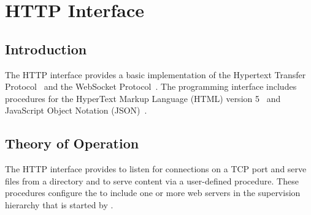 %
%
%


\chapter {HTTP Interface}\label{chap:http}

\section {Introduction}

The HTTP interface provides a basic implementation of the Hypertext
Transfer Protocol~\cite{RFC7230} and the WebSocket
Protocol~\cite{RFC6455}. The programming interface includes procedures
for the HyperText Markup Language (HTML) version 5~\cite{html5} and
JavaScript Object Notation (JSON)~\cite{RFC7159}.

\section {Theory of Operation}

The HTTP interface provides  to listen for
connections on a TCP port and serve files from a directory and
 to serve content via a user-defined
procedure. These procedures configure the  to
include one or more web servers in the supervision hierarchy that is
started by .

